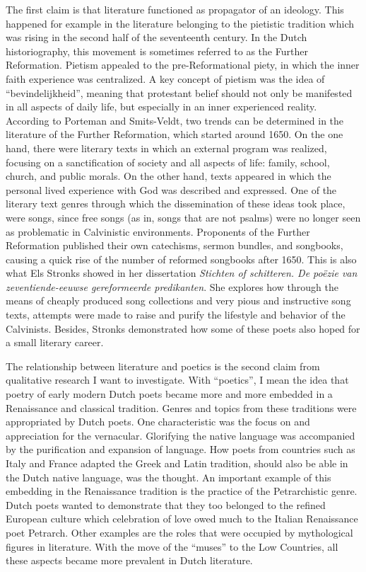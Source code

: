 The first claim is that literature functioned as propagator of an ideology. This happened for example in the literature belonging to the pietistic tradition which was rising in the second half of the seventeenth century. In the Dutch historiography, this movement is sometimes referred to as the Further Reformation. Pietism appealed to the pre-Reformational piety, in which the inner faith experience was centralized.\autocite{eijnatten_nederlandse_2006} A key concept of pietism was the idea of \enquote{bevindelijkheid}, meaning that protestant belief should not only be manifested in all aspects of daily life, but especially in an inner experienced reality. According to Porteman and Smits-Veldt, two trends can be determined in the literature of the Further Reformation, which started around 1650. On the one hand, there were literary texts in which an external program was realized, focusing on a sanctification of society and all aspects of life: family, school, church, and public morals. On the other hand, texts appeared in which the personal lived experience with God was described and expressed. One of the literary text genres through which the dissemination of these ideas took place, were songs, since free songs (as in, songs that are not psalms) were no longer seen as problematic in Calvinistic environments. Proponents of the Further Reformation published their own catechisms, sermon bundles, and songbooks, causing a quick rise of the number of reformed songbooks after 1650.\autocite[658-660]{porteman_een_2009} This is also what Els Stronks showed in her dissertation \textit{Stichten of schitteren. De poëzie van zeventiende-eeuwse gereformeerde predikanten}. She explores how through the means of cheaply produced song collections and very pious and instructive song texts, attempts were made to raise and purify the lifestyle and behavior of the Calvinists.\autocite[36-49]{stronks_stichten_1996-1} Besides, Stronks demonstrated how some of these poets also hoped for a small literary career.

The relationship between literature and poetics is the second claim from qualitative research I want to investigate. With \enquote{poetics}, I mean the idea that poetry of early modern Dutch poets became more and more embedded in a Renaissance and classical tradition. Genres and topics from these traditions were appropriated by Dutch poets. One characteristic was the focus on and appreciation for the vernacular. Glorifying the native language was accompanied by the purification and expansion of language.\autocite[40]{porteman_een_2009} How poets from countries such as Italy and France adapted the Greek and Latin tradition, should also be able in the Dutch native language, was the thought. An important example of this embedding in the Renaissance tradition is the practice of the Petrarchistic genre. Dutch poets wanted to demonstrate that they too belonged to the refined European culture which celebration of love owed much to the Italian Renaissance poet Petrarch.\autocite[131]{gelderblom_investing_2007} Other examples are the roles that were occupied by mythological figures in literature. With the move of the \enquote{muses} to the Low Countries, all these aspects became more prevalent in Dutch literature.

